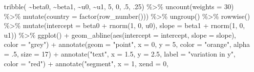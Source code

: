 \documentclass[
  letterpaper,
  DIV=11,
  numbers=noendperiod]{scrreprt}
\newenvironment{Shaded}{\begin{snugshade}}{\end{snugshade}}
\newcommand{\AttributeTok}[1]{\textcolor[rgb]{0.40,0.45,0.13}{#1}}
\newcommand{\DecValTok}[1]{\textcolor[rgb]{0.68,0.00,0.00}{#1}}
\newcommand{\FloatTok}[1]{\textcolor[rgb]{0.68,0.00,0.00}{#1}}
\newcommand{\FunctionTok}[1]{\textcolor[rgb]{0.28,0.35,0.67}{#1}}
\newcommand{\NormalTok}[1]{\textcolor[rgb]{0.00,0.23,0.31}{#1}}
\newcommand{\SpecialCharTok}[1]{\textcolor[rgb]{0.37,0.37,0.37}{#1}}
\newcommand{\StringTok}[1]{\textcolor[rgb]{0.13,0.47,0.30}{#1}}
\begin{document}
\begin{Shaded}
\begin{Highlighting}[]
\FunctionTok{tribble}\NormalTok{(}
  \SpecialCharTok{\textasciitilde{}}\NormalTok{beta0, }\SpecialCharTok{\textasciitilde{}}\NormalTok{beta1, }\SpecialCharTok{\textasciitilde{}}\NormalTok{u0, }\SpecialCharTok{\textasciitilde{}}\NormalTok{u1,}
  \DecValTok{5}\NormalTok{, }\DecValTok{0}\NormalTok{, .}\DecValTok{5}\NormalTok{, .}\DecValTok{25}\NormalTok{) }\SpecialCharTok{\%\textgreater{}\%} 
  \FunctionTok{uncount}\NormalTok{(}\AttributeTok{weights =} \DecValTok{30}\NormalTok{) }\SpecialCharTok{\%\textgreater{}\%}
  \FunctionTok{mutate}\NormalTok{(}\AttributeTok{country =} \FunctionTok{factor}\NormalTok{(}\FunctionTok{row\_number}\NormalTok{())) }\SpecialCharTok{\%\textgreater{}\%}
  \FunctionTok{ungroup}\NormalTok{() }\SpecialCharTok{\%\textgreater{}\%}
  \FunctionTok{rowwise}\NormalTok{() }\SpecialCharTok{\%\textgreater{}\%}
  \FunctionTok{mutate}\NormalTok{(}\AttributeTok{intercept =}\NormalTok{ beta0 }\SpecialCharTok{+} \FunctionTok{rnorm}\NormalTok{(}\DecValTok{1}\NormalTok{, }\DecValTok{0}\NormalTok{, u0),}
         \AttributeTok{slope =}\NormalTok{ beta1 }\SpecialCharTok{+} \FunctionTok{rnorm}\NormalTok{(}\DecValTok{1}\NormalTok{, }\DecValTok{0}\NormalTok{, u1)) }\SpecialCharTok{\%\textgreater{}\%}
  \FunctionTok{ggplot}\NormalTok{() }\SpecialCharTok{+}
  \FunctionTok{geom\_abline}\NormalTok{(}\FunctionTok{aes}\NormalTok{(}\AttributeTok{intercept =}\NormalTok{ intercept, }
                  \AttributeTok{slope =}\NormalTok{ slope),}
              \AttributeTok{color =} \StringTok{"grey"}\NormalTok{) }\SpecialCharTok{+}
  \FunctionTok{annotate}\NormalTok{(}\AttributeTok{geom =} \StringTok{"point"}\NormalTok{, }
           \AttributeTok{x =} \DecValTok{0}\NormalTok{, }
           \AttributeTok{y =} \DecValTok{5}\NormalTok{, }
           \AttributeTok{color =} \StringTok{"orange"}\NormalTok{,}
           \AttributeTok{alpha =}\NormalTok{ .}\DecValTok{5}\NormalTok{,}
           \AttributeTok{size =} \DecValTok{17}\NormalTok{) }\SpecialCharTok{+}
  \FunctionTok{annotate}\NormalTok{(}\StringTok{"text"}\NormalTok{, }
           \AttributeTok{x =} \FloatTok{1.5}\NormalTok{, }
           \AttributeTok{y =} \FloatTok{2.5}\NormalTok{, }
           \AttributeTok{label =} \StringTok{"variation in y"}\NormalTok{,}
           \AttributeTok{color =} \StringTok{"red"}\NormalTok{) }\SpecialCharTok{+}
  \FunctionTok{annotate}\NormalTok{(}\StringTok{"segment"}\NormalTok{, }
           \AttributeTok{x =} \DecValTok{1}\NormalTok{, }
           \AttributeTok{xend =} \DecValTok{0}\NormalTok{, }

\end{Highlighting}
\end{Shaded}
\end{document}

